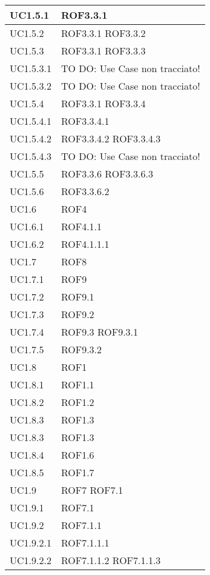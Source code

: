 \begin{center}
\begin{longtable}{| p{4cm} | p{4cm} |}
\hline
UC1.5.1 & ROF3.3.1 \\
\hline
UC1.5.2 & ROF3.3.1 \newline ROF3.3.2 \\
\hline
UC1.5.3 & ROF3.3.1 \newline ROF3.3.3 \\
\hline
UC1.5.3.1 & TO DO: Use Case non tracciato! \\
\hline
UC1.5.3.2 & TO DO: Use Case non tracciato! \\
\hline
UC1.5.4 & ROF3.3.1 \newline ROF3.3.4 \\
\hline
UC1.5.4.1 & ROF3.3.4.1 \\
\hline
UC1.5.4.2 & ROF3.3.4.2 \newline ROF3.3.4.3 \\
\hline
UC1.5.4.3 & TO DO: Use Case non tracciato! \\
\hline
UC1.5.5 & ROF3.3.6 \newline ROF3.3.6.3 \\
\hline
UC1.5.6 & ROF3.3.6.2 \\
\hline
UC1.6 & ROF4 \\
\hline
UC1.6.1 & ROF4.1.1 \\
\hline
UC1.6.2 & ROF4.1.1.1 \\
\hline
UC1.7 & ROF8 \\
\hline
UC1.7.1 & ROF9 \\
\hline
UC1.7.2 & ROF9.1 \\
\hline
UC1.7.3 & ROF9.2 \\
\hline
UC1.7.4 & ROF9.3 \newline ROF9.3.1 \\
\hline
UC1.7.5 & ROF9.3.2 \\
\hline
UC1.8 & ROF1 \\
\hline
UC1.8.1 & ROF1.1 \\
\hline
UC1.8.2 & ROF1.2 \\
\hline
UC1.8.3 & ROF1.3 \\
\hline
UC1.8.3 & ROF1.3 \\
\hline
UC1.8.4 & ROF1.6 \\
\hline
UC1.8.5 & ROF1.7 \\
\hline
UC1.9 & ROF7 \newline ROF7.1 \\
\hline
UC1.9.1 & ROF7.1 \\
\hline
UC1.9.2 & ROF7.1.1 \\
\hline
UC1.9.2.1 & ROF7.1.1.1 \\
\hline
UC1.9.2.2 & ROF7.1.1.2 \newline ROF7.1.1.3 \\

\end{longtable}
\end{center}
